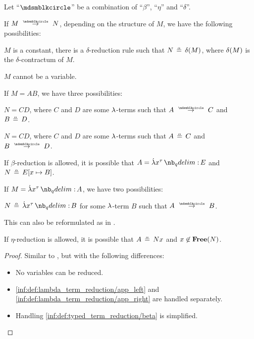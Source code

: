 \begin{lemma}\label{thm:single_step_reduction_deconstruction}
  Let \enquote{\( {\Anon} \)} be a combination of \enquote{\( \beta \)}, \enquote{\( \eta \)} and \enquote{\( \delta \)}.

  If \( M \pred N \), depending on the structure of \( M \), we have the following possibilities:
  \begin{thmenum}
     \( M \) is a constant, there is a \( \delta \)-reduction rule such that \( N \aequiv \op*{\delta}(M) \), where \( \op*{\delta}(M) \) is the \( \delta \)-contractum of \( M \).

     \( M \) cannot be a variable.

     If \( M = AB \), we have three possibilities:
    \begin{thmenum}
       \( N = CD \), where \( C \) and \( D \) are some \( {\mathrm \lambda} \)-terms such that \( A \pred C \) and \( B \aequiv D \).

       \( N = CD \), where \( C \) and \( D \) are some \( {\mathrm \lambda} \)-terms such that \( A \aequiv C \) and \( B \pred D \).

       If \( \beta \)-reduction is allowed, it is possible that \( A = \qabs {x^\tau} E \) and \( N \aequiv E[x \mapsto B] \).
    \end{thmenum}

     If \( M = \qabs {x^\tau} A \), we have two possibilities:
    \begin{thmenum}
       \( N \aequiv \qabs {x^\tau} B \) for some \( {\mathrm \lambda} \)-term \( B \) such that \( A \pred B \).

      This can also be reformulated as in .

       If \( \eta \)-reduction is allowed, it is possible that \( A \aequiv Nx \) and \( x \not\in \op*{Free}(N) \).
    \end{thmenum}
  \end{thmenum}
\end{lemma}
\begin{proof}
  Similar to , but with the following differences:
  \begin{itemize}
    \item No variables can be reduced.
    \item \ref{inf:def:lambda_term_reduction/app_left} and \ref{inf:def:lambda_term_reduction/app_right} are handled separately.
    \item Handling \ref{inf:def:typed_term_reduction/beta} is simplified.
  \end{itemize}
\end{proof}

